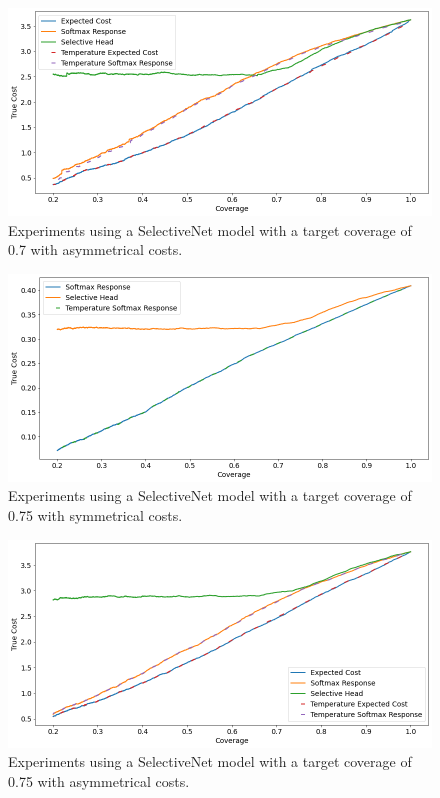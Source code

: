 \begin{figure}[h]
	\includegraphics[width=\textwidth]{images/multi-class/sn0.7-asym.png}
	\caption{Experiments using a SelectiveNet model with a target coverage of 0.7 with asymmetrical costs.}
\end{figure}

\begin{figure}[h]
	\includegraphics[width=\textwidth]{images/multi-class/sn0.75-sym.png}
	\caption{Experiments using a SelectiveNet model with a target coverage of 0.75 with symmetrical costs.}
\end{figure}

\begin{figure}[h]
	\includegraphics[width=\textwidth]{images/multi-class/sn0.75-asym.png}
	\caption{Experiments using a SelectiveNet model with a target coverage of 0.75 with asymmetrical costs.}
\end{figure}

